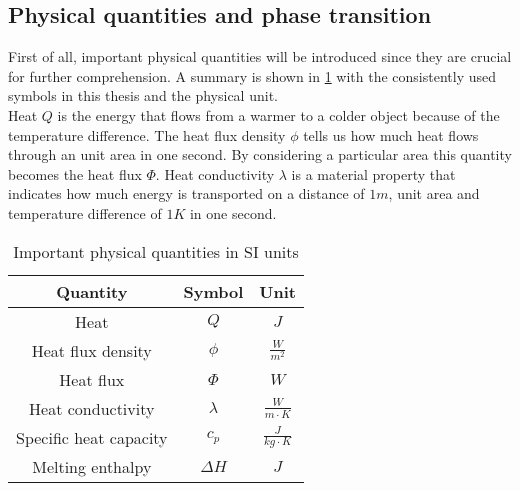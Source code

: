 \documentclass{scrartcl}[12pt, halfparskip]
\numberwithin{equation}{section}
\numberwithin{figure}{section}
\numberwithin{table}{section}
\begin{document}
\subsection{Physical quantities and phase transition}

First of all, important physical quantities will be introduced since they are crucial for further comprehension. A summary is shown in \cref{tab:important_physical_quantities} with the consistently used symbols in this thesis and the physical unit. \\
Heat $Q$ is the energy that flows from a warmer to a colder object because of the temperature difference. The heat flux density $\phi$ tells us how much heat flows through an unit area in one second. By considering a particular area this quantity becomes the heat flux $\varPhi$. Heat conductivity $\lambda$ is a material property that indicates how much energy is transported on a distance of $1m$, unit area and temperature difference of $1K$ in one second.

\begin{table}
	\centering
	\caption{Important physical quantities in SI units}
	\begin{tabular}{| c | c | c |} \hline
		Quantity & Symbol & Unit \\ \hline
		Heat & $Q$ & $J$ \\[0.7ex]
		Heat flux density & $\phi$ & $\frac{W}{m^2}$ \\[0.7ex]
		Heat flux & $\varPhi$ & $W$ \\[0.7ex]
		Heat conductivity & $\lambda$ & $\frac{W}{m \cdot K}$ \\[0.7ex]
		Specific heat capacity & $c_p$ & $\frac{J}{kg \cdot K}$ \\[0.7ex]
		Melting enthalpy & $\Delta H$ & $J$ \\ \hline
	\end{tabular}
\label{tab:important_physical_quantities}
\end{table}
\end{document}
